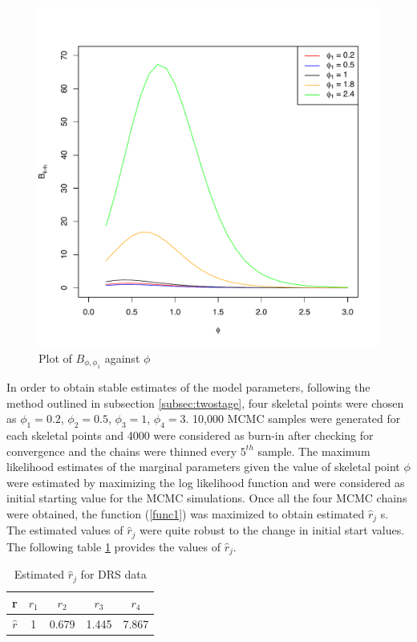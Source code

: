 \documentclass[11pt]{article}
\theoremstyle{remboldstyle}
\begin{document}
\begin{figure}[H]
\begin{center}
\includegraphics[scale=0.4]{plot1.pdf}
\end{center}
\caption{Plot of $B_{\phi, \phi_1}$ against $\phi$}
\end{figure}
\noindent
In order to obtain stable estimates of the model parameters, following the method outlined in subsection \ref{subsec:twostage}, four skeletal points were chosen as $\phi_1= 0.2$, $\phi_2= 0.5$, $\phi_3= 1$, $\phi_4 = 3$. 10,000 MCMC samples were generated for each skeletal points and 4000 were considered as burn-in after checking for convergence and the chains were thinned every $5^{th}$ sample. The maximum likelihood estimates of the marginal parameters given the value of skeletal point $\phi$ were estimated by maximizing the log likelihood function and were considered as initial starting value for the MCMC simulations. Once all the four MCMC chains were obtained, the function (\ref{func1}) was maximized to obtain estimated $\hat{r}_j$ s. The estimated values of $\hat{r}_j$  were quite robust to the change in initial start values. The following table \ref{tab4} provides the values of $\hat{r}_j$. 
\begin{table}[H]
\caption{Estimated $\hat{r}_j$ for DRS data}
\centering
\begin{tabular}{c c c c c}
\hline
r    & $r_1$  & $r_2$  & $r_3$  & $r_4$ \\
\hline
$\hat{r}$ & 1&  0.679 &  1.445  & 7.867 \\
 \hline             
\end{tabular}
\label{tab4}
\end{table}
\end{document}
